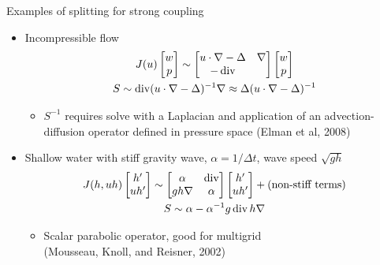 \begin{frame}{Examples of splitting for strong coupling}
  \begin{itemize}
  \item Incompressible flow
    \begin{gather*}
      J(u)
      \begin{bmatrix}
        w \\ p
      \end{bmatrix}
      \sim
      \begin{bmatrix}
        u\cdot\nabla -\Delta & \nabla \\
        -\operatorname{div} &  \\
      \end{bmatrix}
      \begin{bmatrix}
        w \\ p
      \end{bmatrix} \\
      S \sim \operatorname{div} (u\cdot\nabla - \Delta)^{-1} \nabla \approx \Delta (u\cdot\nabla - \Delta)^{-1}
    \end{gather*}
    \begin{itemize}
    \item $S^{-1}$ requires solve with a Laplacian and application of an
      advection-diffusion operator defined in pressure space (Elman et
      al, 2008)
    \end{itemize}
  \item Shallow water with stiff gravity wave, $\alpha = 1/\Delta t$, wave speed $\sqrt{gh}$
    \begin{gather*}
      J(h,uh)
      \begin{bmatrix} h' \\ uh' \end{bmatrix}
      \sim
      \begin{bmatrix}
        \alpha & \operatorname{div} \\
        g h \nabla & \alpha
      \end{bmatrix}
      \begin{bmatrix} h' \\ uh' \end{bmatrix}
      + (\text{non-stiff terms})
      \\
      S \sim \alpha - \alpha^{-1} g \operatorname{div} h\nabla
    \end{gather*}
    \begin{itemize}
    \item Scalar parabolic operator, good for multigrid \\
      (Mousseau, Knoll, and Reisner, 2002)
    \end{itemize}
  \end{itemize}
\end{frame}
